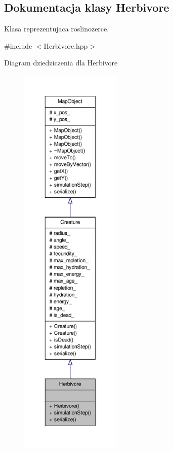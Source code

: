 \hypertarget{classHerbivore}{\subsection{Dokumentacja klasy Herbivore}
\label{classHerbivore}
}


Klasa reprezentujaca roslinozerce.  




{\ttfamily \#include $<$Herbivore.\-hpp$>$}



Diagram dziedziczenia dla Herbivore
\nopagebreak
\begin{figure}[H]
\begin{center}
\leavevmode
\includegraphics[height=550pt]{classHerbivore__inherit__graph}
\end{center}
\end{figure}


